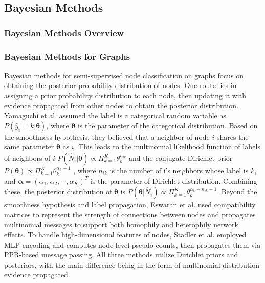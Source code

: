 \subsection{Bayesian Methods}
\subsubsection{Bayesian Methods Overview}
\subsubsection{Bayesian Methods for Graphs}

Bayesian methods for semi-supervised node classification on graphs focus on obtaining the posterior probability distribution of nodes. One route lies in assigning a prior probability distribution to each node, then updating it with evidence propagated from other nodes to obtain the posterior distribution. Yamaguchi et al. \cite{yamaguchi2015socnl} assumed the label is a categorical random variable as $P(\hat{y}_i=k|\boldsymbol{\theta})$, where $\boldsymbol{\theta}$
 is the parameter of the categorical distribution. 
 Based on the smoothness hypothesis, they believed that a neighbor of node $i$ shares the same parameter $\boldsymbol{\theta}$ as $i$. 
 This leads to the multinomial likelihood function of labels of neighbors of $i$ $P(\hat{N}_i|\boldsymbol{\theta})\propto\Pi_{k=1}^K\theta_k^{n_{ik}}$ and the conjugate Dirichlet prior $P(\boldsymbol{\theta})\propto\Pi_{k=1}^K\theta_k^{\alpha_k-1}$
 , where $n_{ik}$ is the number of i’s neighbors whose label is $k$, and $\boldsymbol{\alpha}=(\alpha_1,\alpha_2,\cdots,\alpha_K)^T$ is the parameter of Dirichlet distribution. 
 Combining these, the posterior distribution of $\boldsymbol{\theta}$ is $P(\boldsymbol{\theta}|\hat{N}_i)\propto\Pi_{k=1}^K\theta_k^{\alpha_k+n_{ik}-1}$. Beyond the smoothness hypothesis and label propagation, Eswaran et al. \cite{eswaran2017power} used compatibility matrices to represent the strength of connections between nodes and propagates multinomial messages to support both homophily and heterophily network effects. 
 To handle high-dimensional features of nodes, Stadler et al. \cite{stadler2021graph} employed MLP encoding and computes node-level pseudo-counts, then propagates them via PPR-based message passing. All three methods utilize Dirichlet priors and posteriors, with the main difference being in the form of multinomial distribution evidence propagated.

